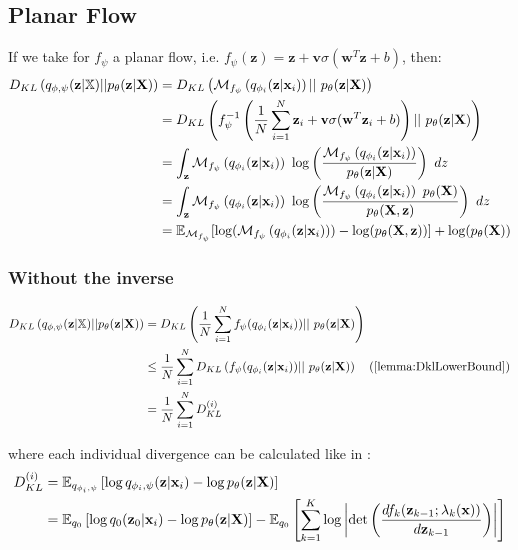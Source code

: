 \documentclass[english]{article}
\begin{document}
    \subsection*{Planar Flow}
    If we take for $f_{\psi}$ a planar flow, i.e. $f_{\psi}(\textbf{z}) = \textbf{z} + \textbf{v}\sigma (\textbf{w}^T\textbf{z} + b)$, then:
    \begin{equation}
        \begin{split}
            \DklTrueApprox &=D_{KL} \left(\Mnfi ||\ \truedistr \right)\\
            &=D_{KL} \left(f_{\psi}^{-1}\left( \frac{1}{N} \sum ^N _{i=1} \textbf{z}_i +\textbf{v} \sigma (\textbf{w}^T \textbf{z}_i +b) \right) ||\ \truedistr \right)\\
            &= \int _{\textbf{z}} \Mnfi \ \log \left( \frac{\Mnfi}{\truedistr} \right)\ dz\\
            &= \int _{\textbf{z}} \Mnfi \ \log \left( \frac{\Mnfi \ p_{\theta}(\textbf{X})}{p_{\theta}(\textbf{X},\textbf{z})} \right)\ dz\\
            &= \mathbb{E}_{\mathcal{M}_{f_{\psi}}}[\log (\Mnfi) - \log(p_{\theta}(\textbf{X},\textbf{z}))] + \log(p_{\theta}(\textbf{X}))
        \end{split}
    \end{equation}

    \subsubsection*{Without the inverse}
    \begin{equation}
        \begin{split}
            \DklTrueApprox &= D_{KL} \left(\frac{1}{N} \sum ^N _{i=1}  f_{\psi} (q_{\phi _i}(\textbf{z}|\textbf{x}_i))||\ \truedistr \right)\\
            & \leq \frac{1}{N} \sum ^N _{i=1} D_{KL} \left(f_{\psi} (q_{\phi _i}(\textbf{z}|\textbf{x}_i))||\ \truedistr \right) \quad (\cref{lemma:DklLowerBound})\\
            &= \frac{1}{N} \sum ^N _{i=1} D_{KL}^{(i)}
        \end{split}
    \end{equation}

    where each individual divergence can be calculated like in \citet{berg_sylvester_2019}:
    \begin{equation}
        \begin{split}
            D_{KL}^{(i)} &= \mathbb{E}_{q_{\phi _i,\psi}} \left[ \log q_{\phi _i,\psi}(\textbf{z}|\textbf{x}_i) - \log p_{\theta}(\textbf{z}|\textbf{X}) \right]\\
            &= \mathbb{E}_{q_{0}} \left[ \log q_{0}(\textbf{z}_0|\textbf{x}_i) -\log p_{\theta}(\textbf{z}|\textbf{X}) \right] - \mathbb{E}_{q_0}\left[ \sum_{k=1}^{K} \log \left| \det \left( \frac{d f_k (\textbf{z}_{k-1}; \lambda_k (\textbf{x}))}{d\textbf{z}_{k-1}} \right) \right| \right]
        \end{split}
    \end{equation}
    \newpage

    \printbibliography
\end{document}

